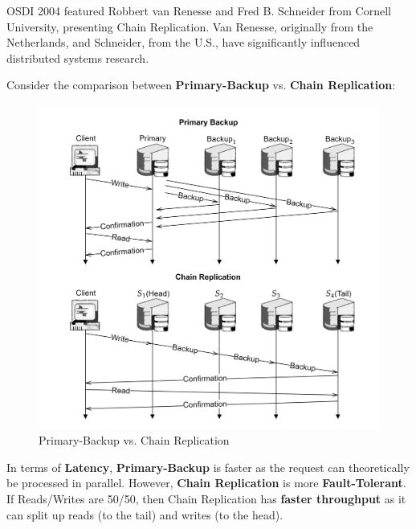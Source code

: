 \vspace{-1em}
\begin{Tip}  
    OSDI 2004 featured Robbert van Renesse and Fred B. Schneider from Cornell University, presenting Chain Replication. Van Renesse, originally from the Netherlands, and Schneider, from the U.S., have significantly influenced distributed systems research.  
    \end{Tip}
    
    
    
\noindent

Consider the comparison between \textbf{Primary-Backup} vs. \textbf{Chain Replication}:
\begin{figure}[h]
    \centering
    \includegraphics[width=1\textwidth]{Sections/rep/comp.png}
    \caption{Primary-Backup vs. Chain Replication}
\end{figure}

\begin{theo}

    In terms of \textbf{Latency}, \textbf{Primary-Backup} is faster as the request can theoretically be processed in parallel. 
    However, \textbf{Chain Replication} is more \textbf{Fault-Tolerant}. If Reads/Writes are 50/50,
    then Chain Replication has \textbf{faster throughput} as it can split up reads (to the tail) and writes (to the head).
\end{theo}

